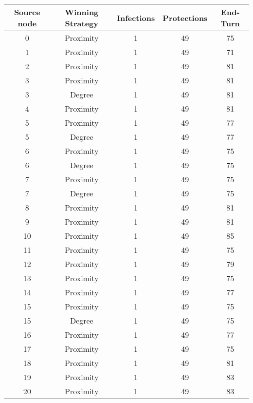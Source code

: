 \documentclass[results.tex]{subfiles}
\begin{document}
\begin{center}
  \begin{tabular}{| c || c | c | c | c |}
    \hline
    {\bfseries Source node} & {\bfseries Winning Strategy} & {\bfseries Infections} & {\bfseries Protections} & {\bfseries End-Turn} \\  %
    \hline\hline
    0 & Proximity & 1 & 49 & 75 \\ 
    \hline
    1 & Proximity & 1 & 49 & 71 \\ 
    \hline
    2 & Proximity & 1 & 49 & 81 \\ 
    \hline
    3 & Proximity & 1 & 49 & 81 \\ 
    \hline
    3 & Degree & 1 & 49 & 81 \\ 
    \hline
    4 & Proximity & 1 & 49 & 81 \\ 
    \hline
    5 & Proximity & 1 & 49 & 77 \\ 
    \hline
    5 & Degree & 1 & 49 & 77 \\ 
    \hline
    6 & Proximity & 1 & 49 & 75 \\ 
    \hline
    6 & Degree & 1 & 49 & 75 \\ 
    \hline
    7 & Proximity & 1 & 49 & 75 \\ 
    \hline
    7 & Degree & 1 & 49 & 75 \\ 
    \hline
    8 & Proximity & 1 & 49 & 81 \\ 
    \hline
    9 & Proximity & 1 & 49 & 81 \\ 
    \hline
    10 & Proximity & 1 & 49 & 85 \\ 
    \hline
    11 & Proximity & 1 & 49 & 75 \\ 
    \hline
    12 & Proximity & 1 & 49 & 79 \\ 
    \hline
    13 & Proximity & 1 & 49 & 75 \\ 
    \hline
    14 & Proximity & 1 & 49 & 77 \\ 
    \hline
    15 & Proximity & 1 & 49 & 75 \\ 
    \hline
    15 & Degree & 1 & 49 & 75 \\ 
    \hline
    16 & Proximity & 1 & 49 & 77 \\ 
    \hline
    17 & Proximity & 1 & 49 & 75 \\ 
    \hline
    18 & Proximity & 1 & 49 & 81 \\ 
    \hline
    19 & Proximity & 1 & 49 & 83 \\ 
    \hline
    20 & Proximity & 1 & 49 & 83 \\ 
    \hline

\end{tabular}
\end{center}
\end{document}
